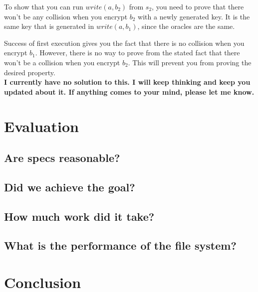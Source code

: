 \documentclass[onecolumn]{paper}
\begin{document}
		To show that you can run $write(a, b_2)$ from $s_2$, you need to prove that there won't be any collision when you encrypt $b_2$ with a newly generated key. It is the same key that is generated in $write(a, b_1)$, since the oracles are the same.
		
		Success of first execution gives you the fact that there is no collision when you encrypt $b_1$. However, there is no way to prove from the stated fact that there won't be a collision when you encrypt $b_2$. This will prevent you from proving the desired property.\\
		
		{\bf I currently have no solution to this. I will keep thinking and keep you updated about it. If anything comes to your mind, please let me know.}
		 
		
		
		
		
		
\newpage
\section{Evaluation}
        \subsection{Are specs reasonable?}
	\subsection{Did we achieve the goal?}
	\subsection{How much work did it take?}
	\subsection{What is the performance of the file system?}

\section{Conclusion}
\end{document}
